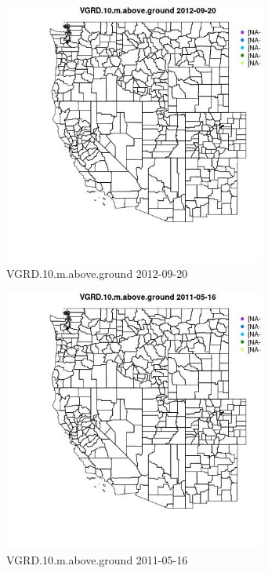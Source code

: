 \begin{figure} 
\centering  
\includegraphics[width=0.77\textwidth]{Code_Outputs/ML_input_report_ML_input_PM25_Step5_part_d_de_duplicated_aves_ML_input_MapObsVGRD10maboveground2012-09-20.jpg} 
\caption{\label{fig:ML_input_report_ML_input_PM25_Step5_part_d_de_duplicated_aves_ML_inputMapObsVGRD10maboveground2012-09-20}VGRD.10.m.above.ground 2012-09-20} 
\end{figure} 
 

\begin{figure} 
\centering  
\includegraphics[width=0.77\textwidth]{Code_Outputs/ML_input_report_ML_input_PM25_Step5_part_d_de_duplicated_aves_ML_input_MapObsVGRD10maboveground2011-05-16.jpg} 
\caption{\label{fig:ML_input_report_ML_input_PM25_Step5_part_d_de_duplicated_aves_ML_inputMapObsVGRD10maboveground2011-05-16}VGRD.10.m.above.ground 2011-05-16} 
\end{figure} 
 

